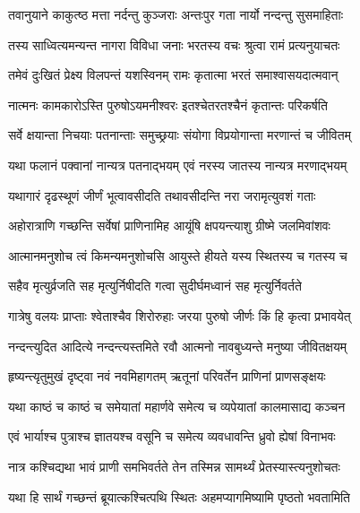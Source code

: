 \twolineshloka
{तवानुयाने काकुत्ष्ठ मत्ता नर्दन्तु कुञ्जराः}
{अन्तःपुर गता नार्यो नन्दन्तु सुसमाहिताः} %

\twolineshloka
{तस्य साध्वित्यमन्यन्त नागरा विविधा जनाः}
{भरतस्य वचः श्रुत्वा रामं प्रत्यनुयाचतः} %

\twolineshloka
{तमेवं दुःखितं प्रेक्ष्य विलपन्तं यशस्विनम्}
{रामः कृतात्मा भरतं समाश्वासयदात्मवान्} %

\twolineshloka
{नात्मनः कामकारोऽस्ति पुरुषोऽयमनीश्वरः}
{इतश्चेतरतश्चैनं कृतान्तः परिकर्षति} %

\twolineshloka
{सर्वे क्षयान्ता निचयाः पतनान्ताः समुच्छ्रयाः}
{संयोगा विप्रयोगान्ता मरणान्तं च जीवितम्} %

\twolineshloka
{यथा फलानं पक्वानां नान्यत्र पतनाद्भयम्}
{एवं नरस्य जातस्य नान्यत्र मरणाद्भयम्} %

\twolineshloka
{यथागारं दृढस्थूणं जीर्णं भूत्वावसीदति}
{तथावसीदन्ति नरा जरामृत्युवशं गताः} %

\twolineshloka
{अहोरात्राणि गच्छन्ति सर्वेषां प्राणिनामिह}
{आयूंषि क्षपयन्त्याशु ग्रीष्मे जलमिवांशवः} %

\twolineshloka
{आत्मानमनुशोच त्वं किमन्यमनुशोचसि}
{आयुस्ते हीयते यस्य स्थितस्य च गतस्य च} %

\twolineshloka
{सहैव मृत्युर्व्रजति सह मृत्युर्निषीदति}
{गत्वा सुदीर्घमध्वानं सह मृत्युर्निवर्तते} %

\twolineshloka
{गात्रेषु वलयः प्राप्ताः श्वेताश्चैव शिरोरुहाः}
{जरया पुरुषो जीर्णः किं हि कृत्वा प्रभावयेत्} %

\twolineshloka
{नन्दन्त्युदित आदित्ये नन्दन्त्यस्तमिते रवौ}
{आत्मनो नावबुध्यन्ते मनुष्या जीवितक्षयम्} %

\twolineshloka
{हृष्यन्त्यृतुमुखं दृष्ट्वा नवं नवमिहागतम्}
{ऋतूनां परिवर्तेन प्राणिनां प्राणसङ्क्षयः} %

\twolineshloka
{यथा काष्ठं च काष्ठं च समेयातां महार्णवे}
{समेत्य च व्यपेयातां कालमासाद्य कञ्चन} %

\twolineshloka
{एवं भार्याश्च पुत्राश्च ज्ञातयश्च वसूनि च}
{समेत्य व्यवधावन्ति ध्रुवो ह्येषां विनाभवः} %

\twolineshloka
{नात्र कश्चिद्यथा भावं प्राणी समभिवर्तते}
{तेन तस्मिन्न सामर्थ्यं प्रेतस्यास्त्यनुशोचतः} %

\twolineshloka
{यथा हि सार्थं गच्छन्तं ब्रूयात्कश्चित्पथि स्थितः}
{अहमप्यागमिष्यामि पृष्ठतो भवतामिति} %

